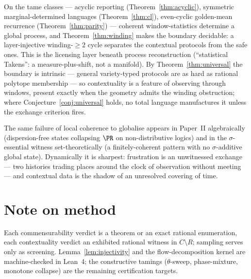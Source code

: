 On the tame classes --- acyclic reporting (Theorem~\ref{thm:acyclic}), symmetric
marginal-determined languages (Theorem~\ref{thm:cl}), even-cyclic golden-mean
recurrence (Theorem~\ref{thm:parity}) --- coherent window-statistics determine a
global process, and Theorem~\ref{thm:winding} makes the boundary decidable: a
layer-injective winding-$\ge2$ cycle separates the contextual protocols from the
safe ones. This is the licensing layer beneath process reconstruction
(``statistical Takens'': a measure-plus-shift, not a manifold). By
Theorem~\ref{thm:universal} the boundary is intrinsic --- general variety-typed
protocols are as hard as rational polytope membership --- so contextuality is a
feature of observing through windows, present exactly when the geometry admits the
winding obstruction; where Conjecture~\ref{conj:universal} holds, no total language
manufactures it unless the exchange criterion fires.

The same failure of local coherence to globalise appears in Paper~II algebraically
(dispersion-free states collapsing $\PR$ on non-distributive logics) and in the
$\sigma$-essential witness set-theoretically (a finitely-coherent pattern with no
$\sigma$-additive global state). Dynamically it is sharpest: frustration is an
unwitnessed exchange --- two histories trading places around the clock of
observation without meeting --- and contextual data is the shadow of an unresolved
covering of time.


\section*{Note on method}\label{sec:method}

Each commensurability verdict is a theorem or an exact rational enumeration, each
contextuality verdict an exhibited rational witness in $C\setminus R$; sampling
serves only as screening. Lemma~\ref{lem:injectivity} and the flow-decomposition
kernel are machine-checked in Lean~4; the constructive tamings ($\theta$-sweep,
phase-mixture, monotone collapse) are the remaining certification targets.

